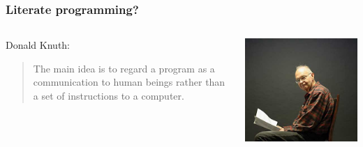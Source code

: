 \documentclass{beamer}\usepackage{graphicx, color}
\begin{document}
\begin{frame}
\frametitle{Literate programming?}

\begin{columns}
\begin{column}{0.55\textwidth}
Donald Knuth: 
\begin{quote}
The main idea is to regard a program as a communication to human beings rather than a set of instructions to a computer.
\end{quote}
\end{column}
\begin{column}{0.45\textwidth}
\includegraphics[width = \textwidth]{knuth}
\end{column}
\end{columns}
\end{frame}
\end{document}
